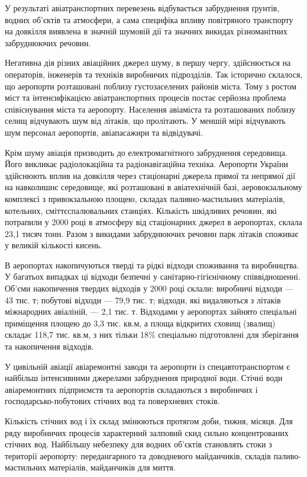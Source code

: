 У результаті авіатранспортних перевезень відбувається забруднення ґрунтів, водних об’єктів та атмосфери, 
а сама специфіка впливу повітряного транспорту на довкілля виявлена в значній шумовій дії та 
значних викидах різноманітних забруднюючих речовин.

Негативна дія різних авіаційних джерел шуму, в першу чергу, здійснюється на операторів, інженерів 
та техніків виробничих підрозділів. Так історично склалося, що аеропорти розташовані поблизу 
густозаселених районів міста. Тому з ростом міст та інтенсифікацією авіатранспортних процесів 
постає серйозна проблема співіснування міста та аеропорту. Населення авіаміста та розташованих 
поблизу селищ відчувають шум від літаків, що пролітають. У меншій мірі відчувають шум персонал 
аеропортів, авіапасажири та відвідувачі.

Крім шуму авіація призводить до електромагнітного забруднення середовища. Його викликає 
радіолокаційна та радіонавігаційна техніка. Аеропорти України здійснюють вплив на довкілля 
через стаціонарні джерела прямої та непрямої дії на навколишнє середовище, які розташовані в 
авіатехнічній базі, аеровокзальному комплексі з привокзальною площею, складах паливно-мастильних 
матеріалів, котельних, сміттєспалювальних станціях. Кількість шкідливих речовин, які потрапили у 
2000 році в атмосферу від стаціонарних джерел в аеропортах, склала 23,1 тисяч тонн. Разом з викидами 
забруднюючих речовин парк літаків споживає у великій кількості кисень. 

В аеропортах накопичуються тверді та рідкі відходи споживання та виробництва. У багатьох випадках 
ці відходи безпечні у санітарно-гігієнічному співвідношенні. Об’єми накопичення твердих відходів 
у 2000 році склали: виробничі відходи --- 43 тис. т; побутові відходи --- 79,9 тис. т; відходи, 
які видаляються з літаків міжнародних авіаліній, --- 2,1 тис. т. Відходами у аеропортах зайнято 
спеціальні приміщення площею до 3,3 тис. кв.м, а площа відкритих сховищ (звалищ) складає 118,7 тис. кв.м, 
з них тільки 18\% спеціально підготовлені для зберігання та накопичення відходів.

У цивільній авіації авіаремонтні заводи та аеропорти із спецавтотранспортом є найбільш інтенсивними 
джерелами забруднення природної води. Стічні води авіаремонтних підприємств та аеропортів складаються 
з виробничих і господарсько-побутових стічних вод та поверхневих стоків. 

Кількість стічних вод і їх склад змінюються протягом доби, тижня, місяця. Для ряду виробничих 
процесів характерний залповий скид сильно концентрованих стічних вод. Найбільшу небезпеку для 
водних об’єктів становлять стоки з території аеропорту: передангарного та доводневого майданчиків, 
складів паливо-мастильних матеріалів, майданчиків для миття. 

